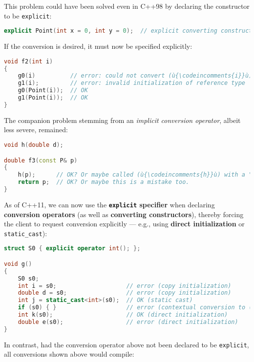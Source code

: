 \noindent This problem could have been solved even in C++98 by declaring the
constructor to be \texttt{explicit}:

\begin{lstlisting}[language=C++]
explicit Point(int x = 0, int y = 0);  // explicit converting constructor
\end{lstlisting}
    
\noindent If the conversion is desired, it must now be specified explicitly:

\begin{lstlisting}[language=C++]
void f2(int i)
{
    g0(i)          // error: could not convert (ù{\codeincomments{i}}ù) from (ù{\codeincomments{int}}ù) to (ù{\codeincomments{Point}}ù)
    g1(i);         // error: invalid initialization of reference type
    g0(Point(i));  // OK
    g1(Point(i));  // OK
}
\end{lstlisting}
    
\noindent The companion problem stemming from an \emph{implicit conversion
operator}, albeit less severe, remained:

\begin{lstlisting}[language=C++]
void h(double d);

double f3(const P& p)
{
    h(p);      // OK? Or maybe called (ù{\codeincomments{h}}ù) with a "hypotenuse" by mistake
    return p;  // OK? Or maybe this is a mistake too.
}
\end{lstlisting}
    
\noindent As of C++11, we can now use the \textbf{\texttt{explicit} specifier}
when declaring \textbf{conversion operators} (as well as
\textbf{converting constructors}), thereby forcing the client to request
conversion explicitly --- e.g., using \textbf{direct initialization} or
\texttt{static\_cast}):

\begin{lstlisting}[language=C++]
struct S0 { explicit operator int(); };

void g()
{
    S0 s0;
    int i = s0;                    // error (copy initialization)
    double d = s0;                 // error (copy initialization)
    int j = static_cast<int>(s0);  // OK (static cast)
    if (s0) { }                    // error (contextual conversion to (ù{\codeincomments{bool}}ù))
    int k(s0);                     // OK (direct initialization)
    double e(s0);                  // error (direct initialization)
}
\end{lstlisting}
    
\noindent In contrast, had the conversion operator above not been declared to be
\texttt{explicit}, all conversions shown above would compile:

